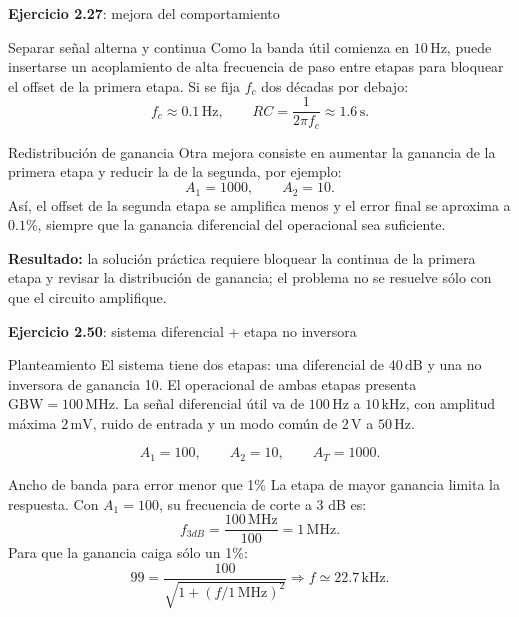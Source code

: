 \documentclass[aspectratio=169,9pt]{beamer}
\newcommand{\exercise}[1]{\textbf{Ejercicio #1}}
\newcommand{\result}[1]{\textbf{\color{eiTeal}Resultado:} #1}
\newcommand{\unit}[1]{\,\mathrm{#1}}
\newcommand{\GBW}{\mathrm{GBW}}
\begin{document}
\begin{frame}{\exercise{2.27}: mejora del comportamiento}
  \begin{block}{Separar señal alterna y continua}
    Como la banda útil comienza en \(10\unit{Hz}\), puede insertarse un acoplamiento de alta frecuencia de paso entre etapas para bloquear el offset de la primera etapa. Si se fija \(f_c\) dos décadas por debajo:
    \[
      f_c \approx 0.1\unit{Hz},\qquad RC=\frac{1}{2\pi f_c}\approx 1.6\unit{s}.
    \]
  \end{block}

  \begin{block}{Redistribución de ganancia}
    Otra mejora consiste en aumentar la ganancia de la primera etapa y reducir la de la segunda, por ejemplo:
    \[
      A_1=1000,\qquad A_2=10.
    \]
    Así, el offset de la segunda etapa se amplifica menos y el error final se aproxima a \(0.1\%\), siempre que la ganancia diferencial del operacional sea suficiente.
  \end{block}

  \result{la solución práctica requiere bloquear la continua de la primera etapa y revisar la distribución de ganancia; el problema no se resuelve sólo con que el circuito amplifique.}
\end{frame}

\begin{frame}[shrink=8]{\exercise{2.50}: sistema diferencial + etapa no inversora}
  \begin{block}{Planteamiento}
    El sistema tiene dos etapas: una diferencial de \(40\unit{dB}\) y una no inversora de ganancia 10. El operacional de ambas etapas presenta \(\GBW=100\unit{MHz}\). La señal diferencial útil va de \(100\unit{Hz}\) a \(10\unit{kHz}\), con amplitud máxima \(2\unit{mV}\), ruido de entrada y un modo común de \(2\unit{V}\) a \(50\unit{Hz}\).
  \end{block}

  \[
    A_1=100,\qquad A_2=10,\qquad A_T=1000.
  \]

  \begin{block}{Ancho de banda para error menor que 1\%}
    La etapa de mayor ganancia limita la respuesta. Con \(A_1=100\), su frecuencia de corte a 3 dB es:
    \[
      f_{3dB}=\frac{100\unit{MHz}}{100}=1\unit{MHz}.
    \]
    Para que la ganancia caiga sólo un 1\%:
    \[
      99=\frac{100}{\sqrt{1+(f/1\unit{MHz})^2}}
      \Rightarrow f\simeq 22.7\unit{kHz}.
    \]
  \end{block}
\end{frame}
\end{document}
